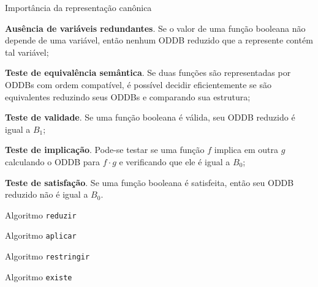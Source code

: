 \expandafter\documentclass\expandafter[table, usenames, svgnames, dvipsnames,14pt, \classopts]{beamer}
\begin{document}
\begin{frame}{Importância da representação canônica}

    \scriptsize

    \begin{outline}
        \1 \textbf{Ausência de variáveis redundantes}. Se o valor de uma função booleana não depende de uma variável, então nenhum ODDB reduzido que a represente contém tal variável;
        
        \vspace{1em}
        
        \1 \textbf{Teste de equivalência semântica}. Se duas funções são representadas por ODDBs com ordem compatível, é possível decidir eficientemente se são equivalentes reduzindo seus ODDBs e comparando sua estrutura;
            
        \vspace{1em}
        
        \1 \textbf{Teste de validade}. Se uma função booleana é válida, seu ODDB reduzido é igual a $B_1$;
        
        \vspace{1em}
        
        \1 \textbf{Teste de implicação}. Pode-se testar se uma função $f$ implica em outra $g$ calculando o ODDB para $f \cdot g$ e verificando que ele é igual a $B_0$;
        
        \vspace{1em}
        
        \1 \textbf{Teste de satisfação}. Se uma função booleana é satisfeita, então seu ODDB reduzido não é igual a $B_0$.
    \end{outline}

\end{frame}

\begin{frame}{Algoritmo \texttt{reduzir}}


\end{frame}

\begin{frame}{Algoritmo \texttt{aplicar}}


\end{frame}

\begin{frame}{Algoritmo \texttt{restringir}}


\end{frame}

\begin{frame}{Algoritmo \texttt{existe}}


\end{frame}
\end{document}
